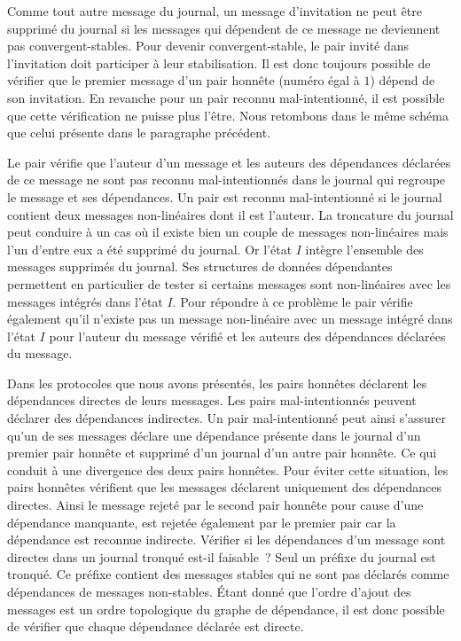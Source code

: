 Comme tout autre message du journal, un message d'invitation ne peut être supprimé du journal si les messages qui dépendent de ce message ne deviennent pas convergent-stables.
Pour devenir convergent-stable, le pair invité dans l'invitation doit participer à leur stabilisation.
Il est donc toujours possible de vérifier que le premier message d'un pair honnête (numéro égal à $1$) dépend de son invitation.
En revanche pour un pair reconnu mal-intentionné, il est possible que cette vérification ne puisse plus l'être.
Nous retombons dans le même schéma que celui présente dans le paragraphe précédent.

Le pair vérifie que l'auteur d'un message et les auteurs des dépendances déclarées de ce message ne sont pas reconnu mal-intentionnés dans le journal qui regroupe le message et ses dépendances.
Un pair est reconnu mal-intentionné si le journal contient deux messages non-linéaires dont il est l'auteur.
La troncature du journal peut conduire à un cas où il existe bien un couple de messages non-linéaires mais l'un d'entre eux a été supprimé du journal.
Or l'état $I$ intègre l'ensemble des messages supprimés du journal.
Ses structures de données dépendantes permettent en particulier de tester si certains messages sont non-linéaires avec les messages intégrés dans l'état $I$.
Pour répondre à ce problème le pair vérifie également qu'il n'existe pas un message non-linéaire avec un message intégré dans l'état $I$ pour l'auteur du message vérifié et les auteurs des dépendances déclarées du message.

Dans les protocoles que nous avons présentés, les pairs honnêtes déclarent les dépendances directes de leurs messages.
Les pairs mal-intentionnés peuvent déclarer des dépendances indirectes.
Un pair mal-intentionné peut ainsi s'assurer qu'un de ses messages déclare une dépendance présente dans le journal d'un premier pair honnête et supprimé d'un journal d'un autre pair honnête.
Ce qui conduit à une divergence des deux pairs honnêtes.
Pour éviter cette situation, les pairs honnêtes vérifient que les messages déclarent uniquement des dépendances directes.
Ainsi le message rejeté par le second pair honnête pour cause d'une dépendance manquante, est rejetée également par le premier pair car la dépendance est reconnue indirecte.
Vérifier si les dépendances d'un message sont directes dans un journal tronqué est-il faisable~?
Seul un préfixe du journal est tronqué.
Ce préfixe contient des messages stables qui ne sont pas déclarés comme dépendances de messages non-stables.
Étant donné que l'ordre d'ajout des messages est un ordre topologique du graphe de dépendance, il est donc possible de vérifier que chaque dépendance déclarée est directe.


